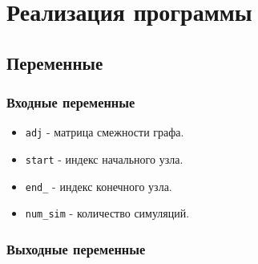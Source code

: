 \documentclass[utf8x]{G7-32} %
\begin{document}
\frontmatter %





\tableofcontents




\mainmatter %



\chapter{Реализация программы}

\section{Переменные}
\subsection{Входные переменные}

\begin{itemize}
    \item \texttt{adj} - матрица смежности графа.
    \item \texttt{start} - индекс начального узла.
    \item \texttt{end_} - индекс конечного узла.
    \item \texttt{num_sim} - количество симуляций.
\end{itemize}

\subsection{Выходные переменные}
\end{document}
